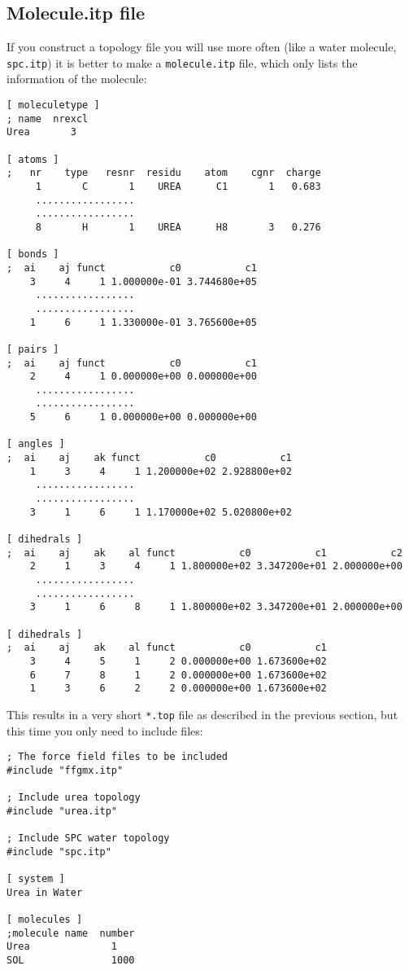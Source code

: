 \subsection{Molecule.itp file}
\label{subsec:molitp}
If you construct a topology file you will use more often (like a water
molecule, {\tt spc.itp}) it is better to make a \verb'molecule.itp'
file, which only lists the information of the molecule: 
{\small
\begin{verbatim}
[ moleculetype ]
; name  nrexcl
Urea       3

[ atoms ]
;   nr    type   resnr  residu    atom    cgnr  charge
     1       C       1    UREA      C1       1	 0.683	
     .................
     .................
     8       H       1    UREA      H8       3	 0.276

[ bonds ]
;  ai    aj funct           c0           c1
    3     4     1 1.000000e-01 3.744680e+05 
     .................
     .................
    1     6     1 1.330000e-01 3.765600e+05 

[ pairs ]
;  ai    aj funct           c0           c1
    2     4     1 0.000000e+00 0.000000e+00 
     .................
     .................
    5     6     1 0.000000e+00 0.000000e+00 

[ angles ]
;  ai    aj    ak funct           c0           c1
    1     3     4     1 1.200000e+02 2.928800e+02 
     .................
     .................
    3     1     6     1 1.170000e+02 5.020800e+02 

[ dihedrals ]
;  ai    aj    ak    al funct           c0           c1           c2
    2     1     3     4     1 1.800000e+02 3.347200e+01 2.000000e+00 
     .................
     .................
    3     1     6     8     1 1.800000e+02 3.347200e+01 2.000000e+00 

[ dihedrals ]
;  ai    aj    ak    al funct           c0           c1
    3     4     5     1     2 0.000000e+00 1.673600e+02 
    6     7     8     1     2 0.000000e+00 1.673600e+02 
    1     3     6     2     2 0.000000e+00 1.673600e+02 
\end{verbatim}
}
This results in a very short \verb'*.top' file as described in the
previous section, but this time you only need to include files:
\begin{verbatim}
; The force field files to be included
#include "ffgmx.itp"
	
; Include urea topology
#include "urea.itp"

; Include SPC water topology
#include "spc.itp"

[ system ]
Urea in Water

[ molecules ]
;molecule name  number
Urea              1
SOL               1000
\end{verbatim}

